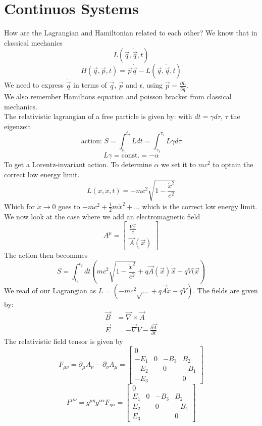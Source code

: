 \documentclass{report}
\begin{document}
\chapter{Continuos Systems}
How are the Lagrangian and Hamiltonian related to each other? We know that in classical mechanics \[
	L(\vec{q}, \dot{\vec{q}}, t)
\] \[
H(\vec{q}, \vec{p}, t) = \vec{p} \dot{\vec{q}} - L\left( \vec{q}, \dot{\vec{q}}, t \right) 
\] We need to express $\dot{\vec{q}}$ in terms of $\vec{q}$, $\vec{p}$ and $t$, using $\vec{p} = \frac{\partial L}{\partial \dot{q}} $. \\
We also remember Hamiltons equation and poisson bracket from classical mechanics.\\
The relativistic lagrangian of a free  particle is given by: with $dt = \gamma d\tau$, $\tau$ the eigenzeit \[
	\text{action: } S = \int_{t_1}^{t_2} L dt = \int_{\tau_1}^{\tau_2} L \gamma d\tau
\] \[
L \gamma = \text{const.} = - \alpha
\] To get a Lorentz-invariant action. To determine $\alpha $ we set it to $mc^2$ to optain the correct low energy limit. \[
L(x, \dot{x}, t) = -mc^2 \sqrt{1 - \frac{\dot{x}^2}{c^2}} 
\] Which for $\dot{x} \to 0$ goes to $-mc^2 + \frac{1}{2} m \dot{x}^2 + \ldots$ which is the correct low energy limit.\\
We now look at the case where we add an electromagnetic field \[
	A^{\mu} = \begin{bmatrix} \frac{V\vec{x}}{c} \\ \vec{A}(\vec{x}) \end{bmatrix} 
\] The action then becommes \[
S = \int_{t_i}^{t_f} dt \left( mc^2 \sqrt{1 - \frac{\dot{x}^2}{c^2}} + q \vec{A}(\vec{x}) \dot{\vec{x}} - q V(\vec{x} \right) 
\] We read of our Lagrangian as $L = \left( -mc^2 \sqrt{\ldots} + q \vec{A} \dot{x} - q V \right) $. The fields are given by:
\begin{align*}
	\vec{B} &= \vec{\nabla } \times \vec{A} \\
	\vec{E} &= - \vec{\nabla } V - \frac{\partial \vec{A}}{\partial t}
\end{align*} The relativistic field tensor is given by \[
	F_{\mu \nu} = \partial_\mu A_\nu - \partial_\nu A_\mu = \begin{bmatrix} 0 & & & \\ -E_1 & 0 & -B_3 & B_2 \\ -E_2 & & 0 & -B_1 \\ -E_3 & & & 0 \end{bmatrix}   
\] \[
	F^{\mu \nu} = g^{\mu \eta} g^{\nu \alpha} F_{\eta \alpha} = \begin{bmatrix} 0 & & & \\ E_1 & 0 & -B_3 & B_2 \\ E_2 & & 0 & -B_1 \\ E_3 & & & 0 \end{bmatrix} 
\] 
\end{document}
